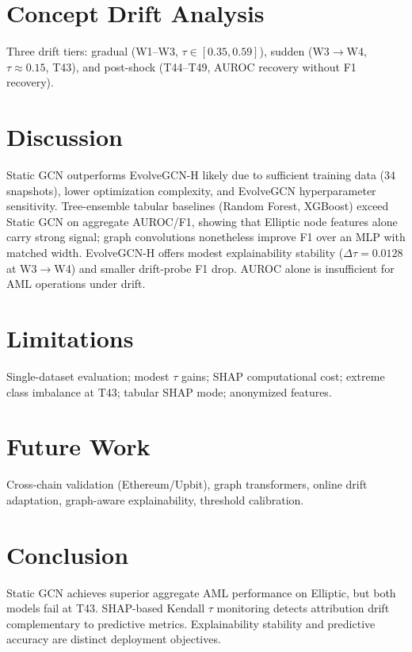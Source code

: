 \documentclass[conference]{IEEEtran}
\begin{document}
\section{Concept Drift Analysis}
Three drift tiers: gradual (W1--W3, $\tau\in[0.35,0.59]$), sudden (W3$\rightarrow$W4, $\tau\approx 0.15$, T43), and post-shock (T44--T49, AUROC recovery without F1 recovery).

\section{Discussion}
Static GCN outperforms EvolveGCN-H likely due to sufficient training data (34 snapshots), lower optimization complexity, and EvolveGCN hyperparameter sensitivity. Tree-ensemble tabular baselines (Random Forest, XGBoost) exceed Static GCN on aggregate AUROC/F1, showing that Elliptic node features alone carry strong signal; graph convolutions nonetheless improve F1 over an MLP with matched width. EvolveGCN-H offers modest explainability stability ($\Delta\tau=0.0128$ at W3$\rightarrow$W4) and smaller drift-probe F1 drop. AUROC alone is insufficient for AML operations under drift.

\section{Limitations}
Single-dataset evaluation; modest $\tau$ gains; SHAP computational cost; extreme class imbalance at T43; tabular SHAP mode; anonymized features.

\section{Future Work}
Cross-chain validation (Ethereum/Upbit), graph transformers, online drift adaptation, graph-aware explainability, threshold calibration.

\section{Conclusion}
Static GCN achieves superior aggregate AML performance on Elliptic, but both models fail at T43. SHAP-based Kendall $\tau$ monitoring detects attribution drift complementary to predictive metrics. Explainability stability and predictive accuracy are distinct deployment objectives.



\end{document}
